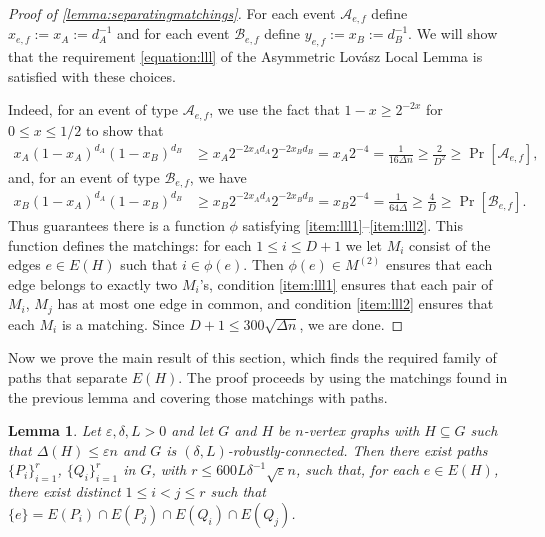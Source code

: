 \documentclass[a4paper, 11pt,reqno]{amsart}
\theoremstyle{plain}
\newtheorem{lemma}[theorem]{Lemma}
\theoremstyle{definition}
\numberwithin{equation}{section}
\DeclareMathOperator{\probability}{Pr}
\newcommand{\eps}{\varepsilon}
\begin{document}
\begin{proof}[Proof of \cref{lemma:separatingmatchings}]
  For each event $\mathcal{A}_{e,f}$ define $x_{e,f} := x_A := d^{-1}_A$ and 
  for each event $\mathcal{B}_{e,f}$ define $y_{e,f} := x_B := d^{-1}_B$.
  We will show that the requirement \eqref{equation:lll} of the 
  Asymmetric Lovász Local Lemma is satisfied with these choices.
  
  Indeed, for an event of type $\mathcal{A}_{e,f}$, we use the fact
  that $1 - x \geq 2^{-2x}$ for $0 \leq x \leq 1/2$ to show that
  \begin{align*}
  	x_{A} \left(1 - x_A \right)^{d_A} \left(1 - x_B \right)^{d_B}
  	& \geq x_A 2^{-2x_A d_A} 2^{-2x_B d_B} = x_A 2^{-4} = \frac{1}{16 \Delta n} \geq \frac{2}{D^2}
  	\geq \probability[\mathcal{A}_{e,f}],
  \end{align*}
  and, for an event of type $\mathcal{B}_{e,f}$, we have
  \begin{align*}
  	x_{B} \left(1 - x_A \right)^{d_A} \left(1 - x_B \right)^{d_B}
  	& \geq x_B 2^{-2x_A d_A} 2^{-2x_B d_B} = x_B 2^{-4} = \frac{1}{64 \Delta} \geq \frac{4}{D}
  	\geq \probability[\mathcal{B}_{e,f}].
  \end{align*}
  Thus  guarantees there is a function $\phi$
  satisfying \ref{item:lll1}--\ref{item:lll2}.  This function
  defines the matchings: for each $1 \leq i \leq D+1$ we let $M_i$
  consist of the edges $e \in E(H)$ such that $i \in \phi(e)$.
  Then $\phi(e) \in M^{(2)}$ ensures that each edge belongs to
  exactly two $M_i$'s, condition \ref{item:lll1} ensures that each
  pair of $M_i$, $M_j$ has at most one edge in common, and
  condition \ref{item:lll2} ensures that each $M_i$ is a matching.
  Since $D+1 \leq 300 \sqrt{\Delta n}$, we are done.
\end{proof}

Now we prove the main result of this section, which finds the required family of paths that separate $E(H)$.
The proof proceeds by using the matchings found in the previous lemma and covering those matchings with paths.

\begin{lemma} \label{lemma:lastfewpaths}
  Let $\eps, \delta, L > 0$ and let $G$ and $H$ be $n$-vertex graphs with $H \subseteq G$ 
  such that $\Delta(H) \leq \eps n$ and $G$ is $(\delta, L)$-robustly-connected. 
  Then there exist paths $\{P_i\}_{i=1}^r$, $\{Q_i\}_{i=1}^r$ in $G$, 
  with $r \leq 600L \delta^{-1} \sqrt{\eps} n$, 
  such that, for each $e \in E(H)$, there exist distinct $1 \leq i < j \leq r$ 
  such that $\{ e \} = E(P_i) \cap E(P_j) \cap E(Q_i) \cap E(Q_j)$.
\end{lemma}
\end{document}
